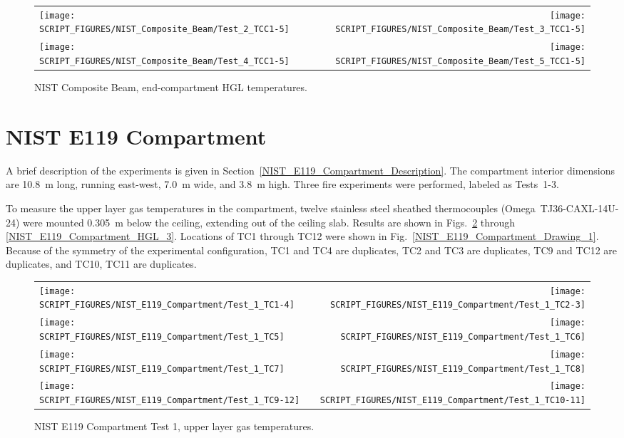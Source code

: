 \begin{figure}[p]
\begin{tabular*}{\textwidth}{l@{\extracolsep{\fill}}r}
\texttt{[image: SCRIPT\_FIGURES/NIST\_Composite\_Beam/Test\_2\_TCC1-5]} &
\texttt{[image: SCRIPT\_FIGURES/NIST\_Composite\_Beam/Test\_3\_TCC1-5]} \\
\texttt{[image: SCRIPT\_FIGURES/NIST\_Composite\_Beam/Test\_4\_TCC1-5]} &
\texttt{[image: SCRIPT\_FIGURES/NIST\_Composite\_Beam/Test\_5\_TCC1-5]}
\end{tabular*}
\caption[NIST Composite Beam, end-compartment HGL temperatures]
{NIST Composite Beam, end-compartment HGL temperatures.}
\label{NIST_CB_HGL_2}
\end{figure}

\clearpage

\section{NIST E119 Compartment}

A brief description of the experiments is given in Section~\ref{NIST_E119_Compartment_Description}. The compartment interior dimensions are 10.8~m long, running east-west, 7.0~m wide, and 3.8~m high. Three fire experiments were performed, labeled as Tests~1-3.

To measure the upper layer gas temperatures in the compartment, twelve stainless steel sheathed thermocouples (Omega~TJ36-CAXL-14U-24) were mounted 0.305~m below the ceiling, extending out of the ceiling slab. Results are shown in Figs.~\ref{NIST_E119_Compartment_HGL_1} through \ref{NIST_E119_Compartment_HGL_3}. Locations of TC1 through TC12 were shown in Fig.~\ref{NIST_E119_Compartment_Drawing_1}. Because of the symmetry of the experimental configuration, TC1 and TC4 are duplicates, TC2 and TC3 are duplicates, TC9 and TC12 are duplicates, and TC10, TC11 are duplicates.

\newpage

\begin{figure}[p]
\begin{tabular*}{\textwidth}{l@{\extracolsep{\fill}}r}
\texttt{[image: SCRIPT\_FIGURES/NIST\_E119\_Compartment/Test\_1\_TC1-4]} &
\texttt{[image: SCRIPT\_FIGURES/NIST\_E119\_Compartment/Test\_1\_TC2-3]} \\
\texttt{[image: SCRIPT\_FIGURES/NIST\_E119\_Compartment/Test\_1\_TC5]} &
\texttt{[image: SCRIPT\_FIGURES/NIST\_E119\_Compartment/Test\_1\_TC6]} \\
\texttt{[image: SCRIPT\_FIGURES/NIST\_E119\_Compartment/Test\_1\_TC7]} &
\texttt{[image: SCRIPT\_FIGURES/NIST\_E119\_Compartment/Test\_1\_TC8]} \\
\texttt{[image: SCRIPT\_FIGURES/NIST\_E119\_Compartment/Test\_1\_TC9-12]} &
\texttt{[image: SCRIPT\_FIGURES/NIST\_E119\_Compartment/Test\_1\_TC10-11]}
\end{tabular*}
\caption[NIST E119 Compartment Test 1, upper layer gas temperatures temperatures]
{NIST E119 Compartment Test 1, upper layer gas temperatures.}
\label{NIST_E119_Compartment_HGL_1}
\end{figure}

